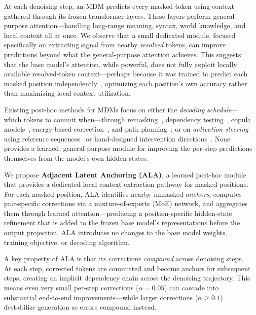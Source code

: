 \documentclass{article} %
\begin{document}
At each denoising step, an MDM predicts every masked token using context gathered through its frozen transformer layers.
These layers perform general-purpose attention---handling long-range meaning, syntax, world knowledge, and local context all at once.
We observe that a small dedicated module, focused specifically on extracting signal from nearby \emph{resolved} tokens, can improve predictions beyond what the general-purpose attention achieves.
This suggests that the base model's attention, while powerful, does not fully exploit locally available resolved-token context---perhaps because it was trained to predict each masked position independently~\citep{sahoo2024simple}, optimizing each position's own accuracy rather than maximizing local context utilization.

Existing post-hoc methods for MDMs focus on either the \emph{decoding schedule}---which tokens to commit when---through remasking~\citep{shi2025remdm}, dependency testing~\citep{chen2025punt}, copula models~\citep{nisonoff2025copula}, energy-based correction~\citep{sun2025edlm}, and path planning~\citep{gat2025p2}; or on \emph{activation steering} using reference sequences~\citep{wang2026ilrr} or hand-designed intervention directions~\citep{turner2024steering, li2023iti}.
None provides a learned, general-purpose module for improving the per-step predictions themselves from the model's own hidden states.

We propose \textbf{Adjacent Latent Anchoring (ALA)}, a learned post-hoc module that provides a dedicated local context extraction pathway for masked positions.
For each masked position, ALA identifies nearby unmasked \emph{anchors}, computes pair-specific corrections via a mixture-of-experts (MoE) network, and aggregates them through learned attention---producing a position-specific hidden-state refinement that is added to the frozen base model's representations before the output projection.
ALA introduces no changes to the base model weights, training objective, or decoding algorithm.

A key property of ALA is that its corrections \emph{compound} across denoising steps.
At each step, corrected tokens are committed and become anchors for subsequent steps, creating an implicit dependency chain across the denoising trajectory.
This means even very small per-step corrections ($\alpha{=}0.05$) can cascade into substantial end-to-end improvements---while larger corrections ($\alpha{\geq}0.1$) destabilize generation as errors compound instead.
\end{document}

